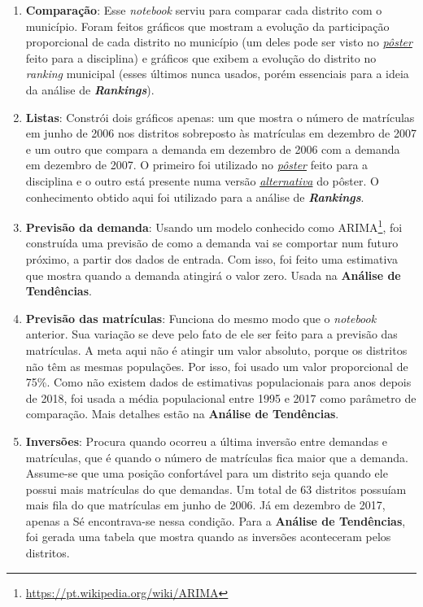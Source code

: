 \documentclass[12pt, a4paper]{article}
\begin{document}
\begin{enumerate}
	\item \textbf{Comparação}: Esse \textit{notebook} serviu para comparar cada distrito com o município. Foram feitos gráficos que mostram a evolução da participação proporcional de cada distrito no município (um deles pode ser visto no \href{https://lsflp.github.io/MAC0213/poster/poster_a1.pdf}{\textit{pôster}} feito para a disciplina) e gráficos que exibem a evolução do distrito no \textit{ranking} municipal (esses últimos nunca usados, porém essenciais para a ideia da análise de \textbf{\textit{Rankings}}).
	\item \textbf{Listas}: Constrói dois gráficos apenas: um que mostra o número de matrículas em junho de 2006 nos distritos sobreposto às matrículas em dezembro de 2007 e um outro que compara a demanda em dezembro de 2006 com a demanda em dezembro de 2007. O primeiro foi utilizado no \href{https://lsflp.github.io/MAC0213/poster/poster_a1.pdf}{\textit{pôster}} feito para a disciplina e o outro está presente numa versão \href{https://lsflp.github.io/MAC0213/poster/poster_a0.pdf}{\textit{alternativa}} do pôster. O conhecimento obtido aqui foi utilizado para a análise de \textbf{\textit{Rankings}}.
	\item \textbf{Previsão da demanda}: Usando um modelo conhecido como ARIMA\footnote{\url{https://pt.wikipedia.org/wiki/ARIMA}}, foi construída uma previsão de como a demanda vai se comportar num futuro próximo, a partir dos dados de entrada. Com isso, foi feito uma estimativa que mostra quando a demanda atingirá o valor zero. Usada na \textbf{Análise de Tendências}.
	\item \textbf{Previsão das matrículas}: Funciona do mesmo modo que o \textit{notebook} anterior. Sua variação se deve pelo fato de ele ser feito para a previsão das matrículas. A meta aqui não é atingir um valor absoluto, porque os distritos não têm as mesmas populações. Por isso, foi usado um valor proporcional de 75\%. Como não existem dados de estimativas populacionais para anos depois de 2018, foi usada a média populacional entre 1995 e 2017 como parâmetro de comparação. Mais detalhes estão na \textbf{Análise de Tendências}.
	\item \textbf{Inversões}: Procura quando ocorreu a última inversão entre demandas e matrículas, que é quando o número de matrículas fica maior que a demanda. Assume-se que uma posição confortável para um distrito seja quando ele possui mais matrículas do que demandas. Um total de 63 distritos possuíam mais fila do que matrículas em junho de 2006. Já em dezembro de 2017, apenas a Sé encontrava-se nessa condição. Para a \textbf{Análise de Tendências}, foi gerada uma tabela que mostra quando as inversões aconteceram pelos distritos.
\end{enumerate}
\end{document}
